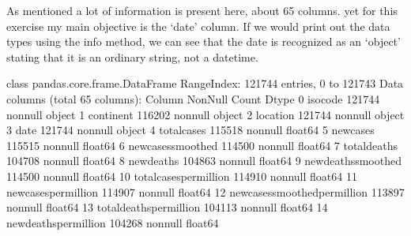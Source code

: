 \documentclass[letterpaper,10pt,english]{jupyterBook}
\begin{document}
\sphinxAtStartPar
As mentioned a lot of information is present here, about 65 columns. yet for this exercise my main objective is the ‘date’ column.
If we would print out the data types using the info method, we can see that the date is recognized as an ‘object’ stating that it is an ordinary string, not a datetime.

\begin{sphinxVerbatim}[commandchars=\\\{\}]
\end{sphinxVerbatim}

\begin{sphinxVerbatim}[commandchars=\\\{\}]
\PYGZlt{}class \PYGZsq{}pandas.core.frame.DataFrame\PYGZsq{}\PYGZgt{}
RangeIndex: 121744 entries, 0 to 121743
Data columns (total 65 columns):
 \PYGZsh{}   Column                                   Non\PYGZhy{}Null Count   Dtype  
\PYGZhy{}\PYGZhy{}\PYGZhy{}  \PYGZhy{}\PYGZhy{}\PYGZhy{}\PYGZhy{}\PYGZhy{}\PYGZhy{}                                   \PYGZhy{}\PYGZhy{}\PYGZhy{}\PYGZhy{}\PYGZhy{}\PYGZhy{}\PYGZhy{}\PYGZhy{}\PYGZhy{}\PYGZhy{}\PYGZhy{}\PYGZhy{}\PYGZhy{}\PYGZhy{}   \PYGZhy{}\PYGZhy{}\PYGZhy{}\PYGZhy{}\PYGZhy{}  
 0   iso\PYGZus{}code                                 121744 non\PYGZhy{}null  object 
 1   continent                                116202 non\PYGZhy{}null  object 
 2   location                                 121744 non\PYGZhy{}null  object 
 3   date                                     121744 non\PYGZhy{}null  object 
 4   total\PYGZus{}cases                              115518 non\PYGZhy{}null  float64
 5   new\PYGZus{}cases                                115515 non\PYGZhy{}null  float64
 6   new\PYGZus{}cases\PYGZus{}smoothed                       114500 non\PYGZhy{}null  float64
 7   total\PYGZus{}deaths                             104708 non\PYGZhy{}null  float64
 8   new\PYGZus{}deaths                               104863 non\PYGZhy{}null  float64
 9   new\PYGZus{}deaths\PYGZus{}smoothed                      114500 non\PYGZhy{}null  float64
 10  total\PYGZus{}cases\PYGZus{}per\PYGZus{}million                  114910 non\PYGZhy{}null  float64
 11  new\PYGZus{}cases\PYGZus{}per\PYGZus{}million                    114907 non\PYGZhy{}null  float64
 12  new\PYGZus{}cases\PYGZus{}smoothed\PYGZus{}per\PYGZus{}million           113897 non\PYGZhy{}null  float64
 13  total\PYGZus{}deaths\PYGZus{}per\PYGZus{}million                 104113 non\PYGZhy{}null  float64
 14  new\PYGZus{}deaths\PYGZus{}per\PYGZus{}million                   104268 non\PYGZhy{}null  float64

\end{sphinxVerbatim}
\end{document}
